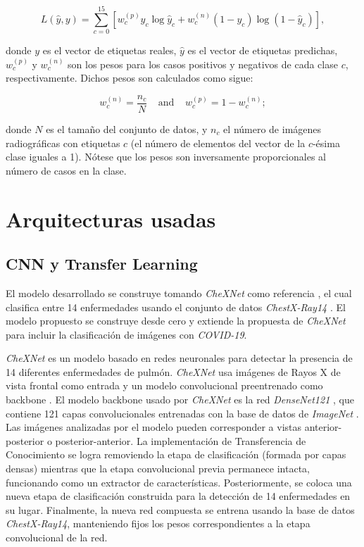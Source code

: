 \begin{equation} \label{eq:loss}
    L(\hat y, y) = \sum_{c=0}^{15} \left[ w_c^{(p)} y_c \log \hat y_c + w_c^{(n)} (1-y_c) \log (1- \hat y_c) \right],
\end{equation}

\noindent donde $y$ es el vector de etiquetas reales, $\hat{y}$ es el vector de etiquetas predichas,
$w_c^{(p)}$ y $w_c^{(n)}$ son los pesos para los casos positivos y negativos de cada clase $c$,
respectivamente. Dichos pesos son calculados como sigue:

\begin{equation}\label{eq:weights}
    w_c^{(n)} = \frac{n_c}{N} \;\;\;\; \text{and} \;\;\;\; w_c^{(p)} = 1-  w_c^{(n)};
\end{equation}

\noindent donde $N$ es el tamaño del conjunto de datos, y $n_c$ el número de imágenes radiográficas con
etiquetas $c$ (el número de elementos del vector de la $c$-ésima clase iguales a 1). Nótese que los
pesos son inversamente proporcionales al número de casos en la clase.



\section{Arquitecturas usadas}

\subsection{CNN y Transfer Learning}

El modelo desarrollado se construye tomando \textit{CheXNet} como referencia \cite{rajpurkar2018deep},
el cual clasifica entre 14 enfermedades usando el conjunto de datos \textit{ChestX-Ray14}
\cite{wang2017chestx}. El modelo propuesto se construye desde cero y extiende la propuesta de
\textit{CheXNet} para incluir la clasificación de imágenes con \textit{COVID-19}.

\textit{CheXNet} es un modelo basado en redes neuronales para detectar la presencia de 14 diferentes
enfermedades de pulmón. \textit{CheXNet} usa imágenes de Rayos X de vista frontal como entrada y un
modelo convolucional preentrenado como backbone \cite{rajpurkar2018deep}. El modelo backbone usado
por \textit{CheXNet} es la red \textit{DenseNet121} \cite{huang2017densely}, que contiene 121 capas
convolucionales entrenadas con la base de datos de \textit{ImageNet} \cite{ILSVRC15}. Las imágenes
analizadas por el modelo pueden corresponder a vistas anterior-posterior o posterior-anterior. La
implementación de Transferencia de Conocimiento se logra removiendo la etapa de clasificación
(formada por capas densas) mientras que la etapa convolucional previa permanece intacta, funcionando
como un extractor de características. Posteriormente, se coloca una nueva etapa de clasificación
construida para la detección de 14 enfermedades en su lugar. Finalmente, la nueva red compuesta se
entrena usando la base de datos \textit{ChestX-Ray14}, manteniendo fijos los pesos correspondientes
a la etapa convolucional de la red.

